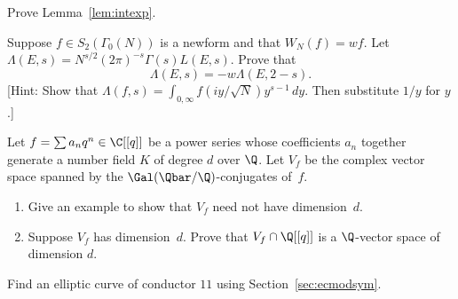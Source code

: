 \begin{exercises}

\item \label{ex:intexp} Prove Lemma~\ref{lem:intexp}. 

\item \label{ex:funceqn} Suppose $f \in S_2(\Gamma_0(N))$ is a newform
and that $W_N(f) = w f$.  Let $\Lambda(E,s) = N^{s/2} (2\pi)^{-s} \Gamma(s) L(E,s)$.
Prove that $$\Lambda(E,s) = -w \Lambda(E,2-s).$$
[Hint: Show that $\Lambda(f,s) = \int_{0,\infty} f(iy/\sqrt{N})y^{s-1}\, dy$.
Then substitute $1/y$ for $y$.]

\item \label{ex:qvs} Let $f=\sum a_n q^n \in \C[[q]]$ be a power
  series whose coefficients $a_n$ together generate a number field $K$ of
  degree $d$ over $\Q$.  Let $V_f$ be the complex vector space spanned
  by the $\Gal(\Qbar/\Q)$-conjugates of~$f$. 
\begin{enumerate}
\item Give an example to show that $V_f$ need not have dimension~$d$.
\item Suppose $V_f$ has dimension~$d$.  Prove that $V_f \cap
  \Q[[q]]$ is a $\Q$-vector space of dimension $d$. 
\end{enumerate}

\item \label{ex:11} Find an elliptic curve of conductor $11$
using Section~\ref{sec:ecmodsym}.

\end{exercises}



























